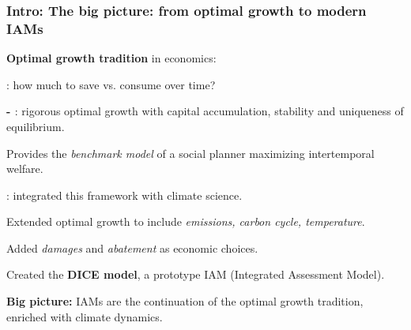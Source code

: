\documentclass[xcolor=x11names,compress,aspectratio=169]{beamer}%
\makeatletter
\renewenvironment{itemize}{\begin{compactitemize}[<+-| alert@+>]}{\end{compactitemize}}
\makeatother
\begin{document}
\begin{frame}%
%

\frametitle{Intro: The big picture: from optimal growth to modern IAMs}%


\begin{itemize}
\item \textbf{Optimal growth tradition} in economics:

\begin{itemize}
\item \textbf{\cite{ramsey1928mathematical}}: how much to save vs. consume
over time?

\item \textbf{\cite{cass1965optimum} - \cite{koopmans1963concept}}: rigorous
optimal growth with capital accumulation, stability and uniqueness of equilibrium.
\end{itemize}

Provides the \emph{benchmark model} of a social planner maximizing
intertemporal welfare.

\vspace{0.4cm}

\item \textbf{\cite{nordhaus1992optimal}}: integrated this framework with
climate science.

\begin{itemize}
\item Extended optimal growth to include \emph{emissions, carbon cycle,
temperature}.

\item Added \emph{damages} and \emph{abatement} as economic choices.

\item Created the \textbf{DICE model}, a prototype IAM (Integrated Assessment Model).
\end{itemize}

\vspace{0.4cm}

\item \textbf{Big picture:} IAMs are the continuation of the optimal growth
tradition, enriched with climate dynamics.
\end{itemize}

%

\transboxout
\end{frame}%
\end{document}
